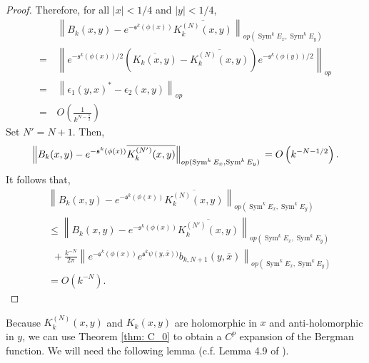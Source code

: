 \documentclass{amsart}
\theoremstyle{definition}
\theoremstyle{remark}
\numberwithin{equation}{section}
\DeclareMathOperator{\Sym}{Sym}
\begin{document}
\begin{proof}
Therefore, for all $|x| <1/4$ and $|y| < 1/4$,
\begin{align*}
& \left \| B_k(x,y) - e^{-\mathfrak{s}^k(\phi(x))} \overline{K_k^{(N)}(x,y)} \right \|_{op(\Sym^k E_x,\Sym^k E_y)} \\
    = \hspace{2pt} & \left \|e^{-\mathfrak{s}^k(\phi(x))/2} \left (  \overline{K_k(x,y)} - \overline{K_k^{(N)}(x,y)} \right) e^{-\mathfrak{s}^k(\phi(y))/2} \right \|_{op} \\
    = \hspace{2pt} & \left \|  \epsilon_1(y,x)^* - \epsilon_2(x,y)  \right \|_{op}  \\
    = \hspace{2pt} & O\left ( \frac{1}{k^{N- \frac{1}{2}}} \right )
\end{align*}
Set $N' = N+1$. Then,
\begin{equation*}
    \left \| B_k(x,y) - e^{-\mathfrak{s}^k(\phi(x))} \overline{K_k^{(N')}(x,y)}  \right \|_{op(\Sym^k E_x,\Sym^k E_y)} \\
    =  O \left (k^{-N-1/2} \right).
\end{equation*}
It follows that,
\begin{equation*}
\begin{split}
    & \left \| B_k(x,y) - e^{-\mathfrak{s}^k(\phi(x))} \overline{K_k^{(N)}(x,y)}  \right \|_{op(\Sym^k E_x,\Sym^k E_y)} \\
    & \leq \left \| B_k(x,y) - e^{-\mathfrak{s}^k(\phi(x))} \overline{K_k^{(N')}(x,y)} \right \|_{op(\Sym^k E_x,\Sym^k E_y)} \\
    & \hspace{5pt} + \frac{k^{-N}}{2\pi} \left \| e^{-\mathfrak{s}^k(\phi(x))}  e^{\mathfrak{s}^k\psi(y,\overline{x}))}b_{k,N+1}(y,\overline{x})\right \|_{op(\Sym^k E_x,\Sym^k E_y)} \\
    & = O\left( k^{-N} \right ).
\end{split}
\end{equation*}


\end{proof}



Because $K_k^{(N)}(x,y)$ and $K_k(x,y)$ are holomorphic in $x$ and anti-holomorphic in $y$, we can use Theorem \ref{thm: C_0} to obtain a $C^p$ expansion of the Bergman function. We will need the following lemma (c.f. Lemma 4.9 of \cite{RT}).
\end{document}
